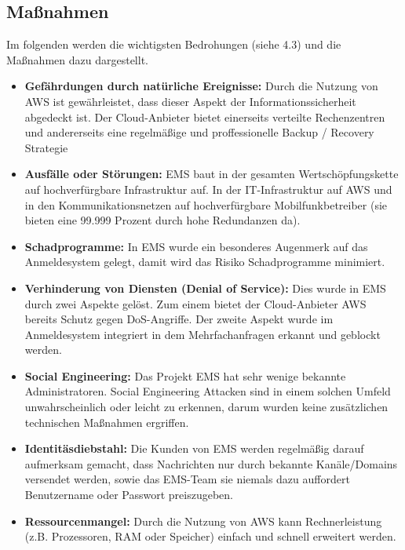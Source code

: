 \subsection{Maßnahmen}
Im folgenden werden die wichtigsten Bedrohungen (siehe 4.3) und die Maßnahmen dazu dargestellt.
\begin{itemize}
	\item \textbf{Gefährdungen durch natürliche Ereignisse:} Durch die Nutzung von AWS ist gewährleistet, dass dieser Aspekt der Informationssicherheit abgedeckt ist. Der Cloud-Anbieter bietet einerseits verteilte Rechenzentren und andererseits eine regelmäßige und proffessionelle Backup / Recovery Strategie
	\item \textbf{Ausfälle oder Störungen:} EMS baut in der gesamten Wertschöpfungskette auf hochverfürgbare Infrastruktur auf. In der IT-Infrastruktur auf AWS und in den Kommunikationsnetzen auf hochverfürgbare Mobilfunkbetreiber (sie bieten eine 99.999 Prozent durch hohe Redundanzen da).
	\item \textbf{Schadprogramme:} In EMS wurde ein besonderes Augenmerk auf das Anmeldesystem gelegt, damit wird das Risiko Schadprogramme minimiert.
	\item \textbf{Verhinderung von Diensten (Denial of Service):} Dies wurde in EMS durch zwei Aspekte gelöst. Zum einem bietet der Cloud-Anbieter AWS bereits Schutz gegen DoS-Angriffe. Der zweite Aspekt wurde im Anmeldesystem integriert in dem Mehrfachanfragen erkannt und geblockt werden.
	\item \textbf{Social Engineering:} Das Projekt EMS hat sehr wenige bekannte Administratoren. Social Engineering Attacken sind in einem solchen Umfeld unwahrscheinlich oder leicht zu erkennen, darum wurden keine zusätzlichen technischen Maßnahmen ergriffen.
	\item \textbf{Identitäsdiebstahl:} Die Kunden von EMS werden regelmäßig darauf aufmerksam gemacht, dass Nachrichten nur durch bekannte Kanäle/Domains versendet werden, sowie das EMS-Team sie niemals dazu auffordert Benutzername oder Passwort preiszugeben.
	\item \textbf{Ressourcenmangel:} Durch die Nutzung von AWS kann Rechnerleistung (z.B. Prozessoren, RAM oder Speicher) einfach und schnell erweitert werden.
\end{itemize}


\newpage